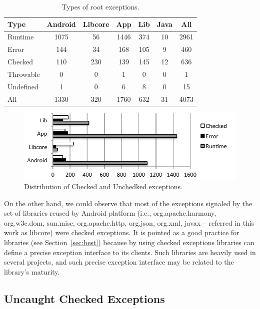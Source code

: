 \documentclass[conference]{IEEEtran}
\begin{document}
\begin{table}
\centering
\begin{tabular}{lcccccc}
    \hline
    \bfseries{Type} & \bfseries{Android} & \bfseries{Libcore} & \bfseries{App} & \bfseries{Lib} & \bfseries{Java} & \bfseries{All}\\
    \hline

Runtime	&	1075	&	56	&	1446	&	374	&	10	&	2961	\\
Error	&	144	&	34	&	168	&	105	&	9	&	460	\\
Checked	&	110	&	230	&	139	&	145	&	12	&	636	\\
Throwable	&	0	&	0	&	1	&	0	&	0	&	1	\\
Undefined	&	1	&	0	&	6	&	8	&	0	&	15	\\
    \hline
All		& 1330	&	320	&	1760	&	632	&	31	&	4073	\\
    \hline
  \end{tabular}
\caption{Types of root exceptions.}
  \label{tab:typeroottab}
\end{table}


\begin{figure}
\centering
\includegraphics[width=\hsize]{exception_types.pdf}
\caption{Distribution of Checked and Unchedked exceptions.}
\label{fig:typeroot}
\end{figure}

On the other hand, we could observe that most of the exceptions signaled by the set of 
libraries reused by Android platform (i.e., org.apache.harmony,
org.w3c.dom, sun.misc, org.apache.http, org.json, org.xml, javax -- referred in
this work as libcore) were checked exceptions. It is pointed as a good practice
for libraries (see Section~\ref{sec:best}) because by using checked exceptions
libraries can define a precise exception interface to its clients. Such
libraries are heavily used in several projects, and such precise exception
interface may be related to the library's maturity.

\subsection{Uncaught Checked Exceptions}
\end{document}

